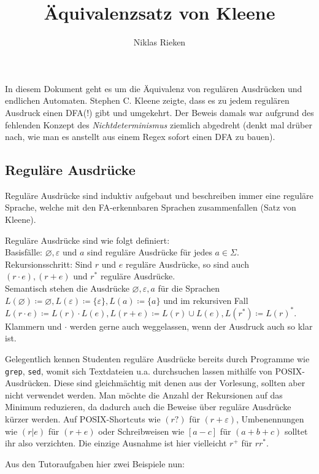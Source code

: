 \documentclass[11pt, a4paper]{article}
\author{Niklas Rieken}
\title{Äquivalenzsatz von Kleene}
\let\emptyset\varnothing
\begin{document}
\maketitle

In diesem Dokument geht es um die Äquivalenz von regulären Ausdrücken und endlichen Automaten. Stephen C. Kleene zeigte, dass es zu jedem regulären Ausdruck einen DFA(!) gibt und umgekehrt. Der Beweis damals war aufgrund des fehlenden Konzept des \textit{Nichtdeterminismus} ziemlich abgedreht (denkt mal drüber nach, wie man es anstellt aus einem Regex sofort einen DFA zu bauen).

\subsection*{Reguläre Ausdrücke}
Reguläre Ausdrücke sind induktiv aufgebaut und beschreiben immer eine reguläre Sprache, welche mit den FA-erkennbaren Sprachen zusammenfallen (Satz von Kleene).\par
Reguläre Ausdrücke sind wie folgt definiert:\\
Basisfälle: $\emptyset, \varepsilon$ und $a$ sind reguläre Ausdrücke für jedes $a \in \Sigma$.\\
Rekursionsschritt: Sind $r$ und $e$ reguläre Ausdrücke, so sind auch $(r \cdot e), (r + e)$ und $r^\ast$ reguläre Ausdrücke.\\
Semantisch stehen die Ausdrücke $\emptyset, \varepsilon, a$ für die Sprachen $L(\emptyset) \coloneqq \emptyset, L(\varepsilon) \coloneqq \{ \varepsilon \}, L(a) \coloneqq \{ a \}$ und im rekursiven Fall $L(r \cdot e) \coloneqq L(r) \cdot L(e), L(r + e) \coloneqq L(r) \cup L(e), L(r^\ast) \coloneqq L(r)^\ast$. Klammern und $\cdot$ werden gerne auch weggelassen, wenn der Ausdruck auch so klar ist.\par
Gelegentlich kennen Studenten reguläre Ausdrücke bereits durch Programme wie \texttt{grep}, \texttt{sed}, womit sich Textdateien u.a. durchsuchen lassen mithilfe von POSIX-Ausdrücken. Diese sind gleichmächtig mit denen aus der Vorlesung, sollten aber nicht verwendet werden. Man möchte die Anzahl der Rekursionen auf das Minimum reduzieren, da dadurch auch die Beweise über reguläre Ausdrücke kürzer werden. Auf POSIX-Shortcuts wie $(r?)$ für $(r + \varepsilon)$, Umbenennungen wie $(r|e)$ für $(r + e)$ oder Schreibweisen wie $[a-c]$ für $(a + b + c)$ solltet ihr also verzichten. Die einzige Ausnahme ist hier vielleicht $r^+$ für $rr^\ast$.\par
Aus den Tutoraufgaben hier zwei Beispiele nun:
\end{document}
